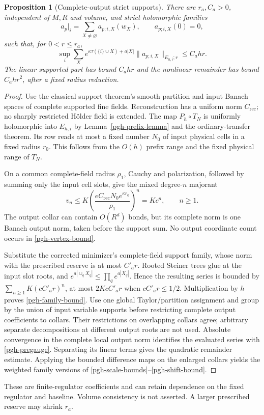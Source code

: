 \documentclass[11pt]{article}
\newtheorem{proposition}[theorem]{Proposition}
\theoremstyle{remark}
\begin{document}
\begin{proposition}[Complete-output strict supports]
\label{pgh-support-proposition}
There are $r_a,C_a>0$, independent of $M,R$ and volume, and strict
holomorphic families
\begin{equation}
 a_p|_i=\sum_{X\ne\varnothing}a_{p;i,X}(w_X),\qquad
 a_{p;i,X}(0)=0,
 \label{pgh-family}
\end{equation}
such that, for $0<r\le r_a$,
\begin{equation}
 \sup_i\sum_X e^{\kappa\tau(\{i\}\cup X)+a|X|}
       \|a_{p;i,X}\|_{E_{h,i};r}\le C_a h r.
 \label{pgh-family-bound}
\end{equation}
The linear supported part has bound $C_ahr$ and the nonlinear
remainder has bound $C_ahr^2$, after a fixed radius reduction.
\end{proposition}
\begin{proof}
Use the classical support theorem's smooth partition and input
Banach spaces of complete supported fine fields. Reconstruction
has a uniform norm $C_{\mathrm{rec}}$; no sharply restricted
H\"older field is extended. The map $P_h\circ T_N$ is uniformly
holomorphic into $E_{h,i}$ by Lemma~\ref{pgh-prefix-lemma} and
the ordinary-transfer theorem. Its row reads at most a fixed
number $N_0$ of input physical cells in a fixed radius $r_0$.
This follows from the $O(h)$ prefix range and the fixed physical
range of $T_N$.

On a common complete-field radius $\rho_1$, Cauchy and
polarization, followed by summing only the input cell slots,
give the mixed degree-$n$ majorant
\begin{equation}
 v_n\le K
 \left(\frac{eC_{\mathrm{rec}}N_0e^{\kappa r_0}}{\rho_1}\right)^n
       =Kc^n,\qquad n\ge1.
 \label{pgh-vertex-bound}
\end{equation}
The output collar can contain $O(R^d)$ bonds, but its complete
norm is one Banach output norm, taken before the support sum.
No output coordinate count occurs in \eqref{pgh-vertex-bound}.

Substitute the corrected minimizer's complete-field support
family, whose norm with the prescribed reserve is at most
$C'_ar$. Rooted Steiner trees glue at the input slot roots,
and $e^{a|\cup_qX_q|}\le\prod_qe^{a|X_q|}$. Hence the resulting
series is bounded by $\sum_{n\ge1}K(cC'_ar)^n$, at most
$2KcC'_ar$ when $cC'_ar\le1/2$. Multiplication by $h$ proves
\eqref{pgh-family-bound}. Use one global Taylor/partition assignment
and group by the union of input variable supports before restricting
complete output coefficients to collars. Their restrictions on
overlapping collars agree; arbitrary separate decompositions at
different output roots are not used. Absolute convergence in the complete
local output norm identifies the evaluated series with
\eqref{pgh-pregauge}. Separating its linear terms gives the
quadratic remainder estimate. Applying the bounded difference
maps on the enlarged collars yields the weighted family versions
of \eqref{pgh-scale-bounds}--\eqref{pgh-shift-bound}.
\end{proof}
These are finite-regulator coefficients and can retain dependence
on the fixed regulator and baseline. Volume consistency is not
asserted. A larger prescribed reserve may shrink $r_a$.
\end{document}
